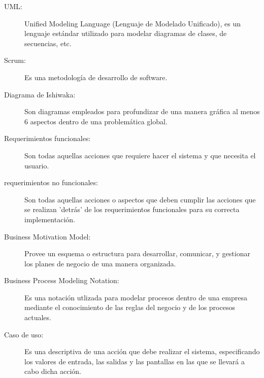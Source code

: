 \begin{description}
	\item[UML:] Unified Modeling Language (Lenguaje de Modelado Unificado), es un lenguaje estándar utilizado para modelar diagramas de clases, de secuencias, etc.
\end{description}

\begin{description}
	\item[Scrum:] Es una metodología de desarrollo de software.
\end{description}

\begin{description}
	\item[Diagrama de Ishiwaka:] Son diagramas empleados para profundizar de una manera gráfica al menos 6 aspectos dentro de una problemática global.
\end{description}

\begin{description}
	\item[Requerimientos funcionales:] Son todas aquellas acciones que requiere hacer el sistema y que necesita el usuario.
\end{description}

\begin{description}
	\item[requerimientos no funcionales:] Son todas aquellas acciones o aspectos que deben cumplir las acciones que se realizan 'detrás' de los requerimientos funcionales para su correcta implementación.
\end{description}

\begin{description}
	\item[Business Motivation Model:] Provee un esquema o estructura para desarrollar, comunicar, y gestionar los planes de negocio de una manera organizada.
\end{description}

\begin{description}
	\item[Business Process Modeling Notation:] Es una notación utlizada para modelar procesos dentro de una empresa mediante el conocimiento de las reglas del negocio y de los procesos actuales.
\end{description}

\begin{description}
	\item[Caso de uso:] Es una descriptiva de una acción que debe realizar el sistema, especificando los valores de entrada, las salidas y las pantallas en las que se llevará a cabo dicha acción.
\end{description}


